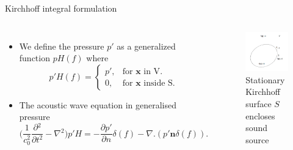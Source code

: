 \documentclass[10pt, aspectratio=169]{beamer}
\begin{document}
\begin{frame}{Kirchhoff integral formulation}
	\begin{columns}
		\begin{itemize}
			\item We define the pressure $p'$ as a generalized function $pH(f)$ where
			\begin{equation*}\label{Generalized_Functions}
				p' H(f) =\begin{cases}
					p' , & \text{for $\mathbf{x}$ in V}.     \\
					0,  & \text{for $\mathbf{x}$ inside S}.
				\end{cases}
			\end{equation*}
			\item The acoustic wave equation in generalised pressure
			\begin{equation*}\label{Generalized Wave Equation}
				\Bigg( \frac{1}{c_{0}^2}\frac{\partial{}^{2}}{\partial{t}^{2}}- \nabla{}^{2} \Bigg) p'H = -\frac{\partial p'}{\partial n}\delta(f) - \nabla.(p' \mathbf{n} \delta(f)).
			\end{equation*}
		\end{itemize}
				
		\begin{figure}[h]
			\includegraphics[scale = 0.3]{images/kirchhoff_surface.png}
			\caption{Stationary Kirchhoff surface $S$ encloses sound source}	
		\end{figure}
							
	\end{columns}
\end{frame}
\end{document}
